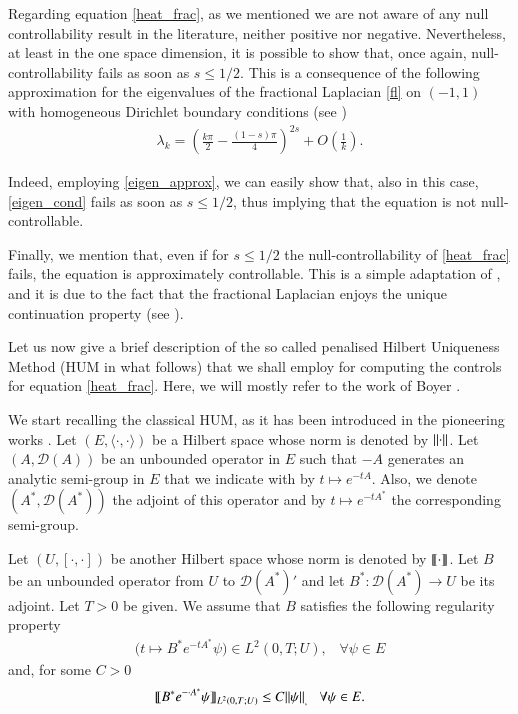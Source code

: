 Regarding equation \eqref{heat_frac}, as we mentioned we are not aware of any null controllability result in the literature, neither positive nor negative. Nevertheless, at least in the one space dimension, it is possible to show that, once again, null-controllability fails as soon as $s\leq 1/2$. This is a consequence of the following approximation for the eigenvalues of the fractional Laplacian \eqref{fl} on $(-1,1)$ with homogeneous Dirichlet boundary conditions (see \cite{kulczycki2010spectral,kwasnicki2012eigenvalues}) 
\begin{align}\label{eigen_approx}
	\lambda_k = \left(\frac{k\pi}{2}-\frac{(1-s)\pi}{4}\right)^{2s}+O\left(\frac{1}{k}\right).
\end{align} 

Indeed, employing \eqref{eigen_approx}, we can easily show that, also in this case, \eqref{eigen_cond} fails as soon as $s\leq 1/2$, thus implying that the equation is not null-controllable. 

Finally, we mention that, even if for $s\leq 1/2$ the null-controllability of \eqref{heat_frac} fails, the equation is approximately controllable. This is a simple adaptation of \cite[Proposition 2.4 and Theorem 2.5]{keyantuo2016interior}, and it is due to the fact that the fractional Laplacian enjoys the unique continuation property (see \cite{fall2014unique}).      

Let us now give a brief description of the so called penalised Hilbert Uniqueness Method (HUM in what follows) that we shall employ for computing the controls for equation \eqref{heat_frac}. Here, we will mostly refer to the work of Boyer \cite{boyer2013penalised}.

We start recalling the classical HUM, as it has been introduced in the pioneering works \cite{glowinski1995exact,glowinski2008exact}. Let $(E,\langle\cdot,\cdot\rangle)$ be a Hilbert space whose norm is denoted by ${\left\|\cdot\right\|}_{}$. Let $(A,\mathcal D(A))$ be an unbounded operator in $E$ such that $-A$ generates an analytic semi-group in $E$ that we indicate with by $t\mapsto e^{-tA}$. Also, we denote $(A^*,\mathcal D(A^*))$ the adjoint of this operator and by $t\mapsto e^{-tA^*}$ the corresponding semi-group. 

Let $(U,[\cdot,\cdot])$ be another Hilbert space whose norm is denoted by $\llbracket \cdot\rrbracket$. Let  $B$ be an unbounded operator from $U$ to $\mathcal D(A^*)'$ and let $B^*:\mathcal D(A^*)\to U$ be its adjoint. Let $T>0$ be given. We assume that $B$ satisfies the following regularity property
\begin{align*}
	\Big(t\mapsto B^*e^{-tA^*}\psi\Big)\in L^2(0,T;U),\;\;\;\forall\psi\in E 
\end{align*}
and, for some $C>0$
\begin{align*}
	\llbracket B^*e^{-\cdot A^*}\psi\rrbracket_{L^2(0,T;U)}\leq C{\left\|\psi\right\|}_{,}\;\;\;\forall\psi\in E. 
\end{align*}

